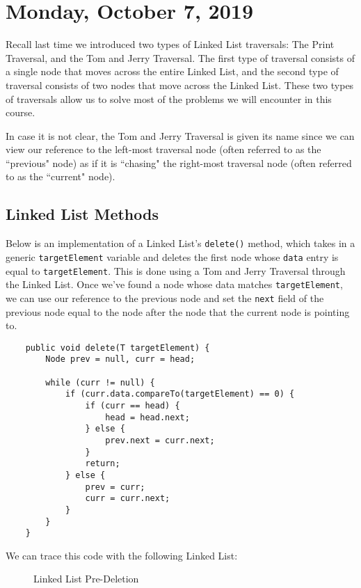 \section{Monday, October 7, 2019}
Recall last time we introduced two types of Linked List traversals: The Print Traversal, and the Tom and Jerry Traversal. The first type of traversal consists of a single node that moves across the entire Linked List, and the second type of traversal consists of two nodes that move across the Linked List. These two types of traversals allow us to solve most of the problems we will encounter in this course. 

In case it is not clear, the Tom and Jerry Traversal is given its name since we can view our reference to the left-most traversal node (often referred to as the ``previous" node) as if it is ``chasing" the right-most traversal node (often referred to as the ``current" node). 



\subsection{Linked List Methods}
Below is an implementation of a Linked List's \verb!delete()! method, which takes in a generic \verb!targetElement! variable and deletes the first node whose \verb!data! entry is equal to \verb!targetElement!.  This is done using a Tom and Jerry Traversal through the Linked List. Once we've found a node whose data matches \verb!targetElement!, we can use our reference to the previous node and set the \verb!next! field of the previous node equal to the node after the node that the current node is pointing to. 

\begin{lstlisting}
	public void delete(T targetElement) {
		Node prev = null, curr = head;

		while (curr != null) {
			if (curr.data.compareTo(targetElement) == 0) {
				if (curr == head) {
					head = head.next;
				} else {
					prev.next = curr.next;
				}
				return;
			} else {
				prev = curr;
				curr = curr.next;
			}
		}
	}
\end{lstlisting}

We can trace this code with the following Linked List:
\begin{figure}[h]
\centering
{}
\caption{Linked List Pre-Deletion}
\end{figure}

